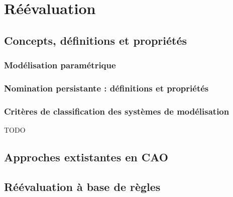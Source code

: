 \section[Réévaluation]{Réévaluation}
\label{sec:etat-art-reevaluation}

\subsection[Concepts, définitions et propriétés]{Concepts, définitions et propriétés}
\label{sec:etat-art-reevaluation-defs-props}

\subsubsection[Modélisation paramétrique]{Modélisation paramétrique}
\label{sec:etat-art-reevaluation-model-param}

\subsubsection[Nomination persistante : définitions et propriétés]{Nomination persistante : définitions et propriétés}
\label{sec:etat-art-reevaluation-model-param-nom-persistant-def-props}

\subsubsection[Critères de classification des systèmes de modélisation]{Critères de classification des systèmes de modélisation}
\label{sec:etat-art-reevaluation-model-param-criteres}

TODO


\subsection[Approches existantes en CAO]{Approches extistantes en CAO}
\label{sec:etat-art-reevaluation-approches}

\subsection[Réévaluation à base de règles]{Réévaluation à base de règles}
\label{sec:etat-art-reevaluation-reevaluation-regles}



